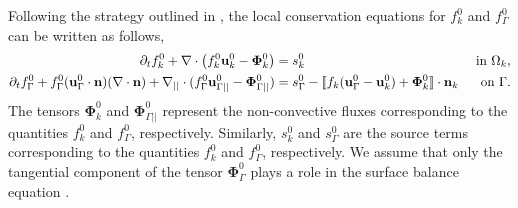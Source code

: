 Following the strategy outlined in \citep{ishii2010thermo,bothe2022sharp}, the local conservation equations for $f_k^0$ and $f_\Gamma^0$ can be written as follows,
\begin{align}
    \label{eq:dt_f_k}
    \pddt f_k^0
    +\div \left(
        f_k^0\textbf{u}_k^0
        - \mathbf{\Phi}_k^0
        \right)
    &= 
    s_k^0
    & \text{ in } \Omega_k,&\\
    \pddt f_\Gamma^0 
    + f_\Gamma^0 (\textbf{u}_\Gamma^0 \cdot \textbf{n})(\div \textbf{n})
    +\divI
    (f_\Gamma^0 \textbf{u}_{\Gamma||}^0
        - \mathbf{\Phi}_{\Gamma||}^0 )
    &= 
    s_\Gamma^0
    - \Jump{
       f_k (\textbf{u}_\Gamma^0 - \textbf{u}_k^0)
       + \mathbf{\Phi}_k^0
    } 
    & \text{ on } \Gamma.&
    \label{eq:dt_f_I}
\end{align}
The tensors $\mathbf{\Phi}_k^0$ and $\mathbf{\Phi}_{\Gamma||}^0$ represent the non-convective fluxes corresponding to the quantities $f_k^0$ and $f_\Gamma^0$, respectively. Similarly, $s_k^0$ and $s_\Gamma^0$ are the source terms corresponding to the quantities $f_k^0$ and $f_\Gamma^0$, respectively. We assume that only the tangential component of the tensor $\mathbf{\Phi}_{\Gamma}^0$ plays a role in the surface balance equation \citep{bothe2022sharp}. 
